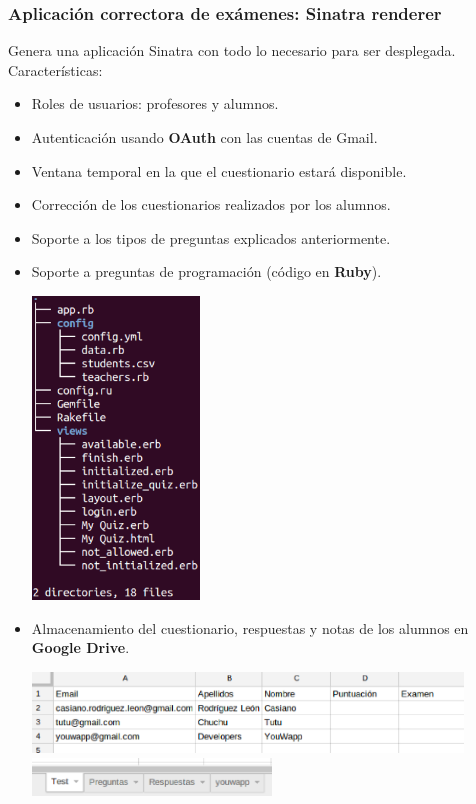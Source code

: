 \documentclass{beamer}
\begin{document}
\begin{frame}[allowframebreaks]
\frametitle{Aplicación correctora de exámenes: Sinatra renderer}
  Genera una aplicación Sinatra con todo lo necesario para ser desplegada.
  Características:
  \begin{itemize}
    \item Roles de usuarios: profesores y alumnos.
    \item Autenticación usando {\bfseries OAuth} con las cuentas de Gmail.
    \item Ventana temporal en la que el cuestionario estará disponible.
    \item Corrección de los cuestionarios realizados por los alumnos.
    \item Soporte a los tipos de preguntas explicados anteriormente.
    \item Soporte a preguntas de programación (código en {\bfseries Ruby}).
    \framebreak
    
    \begin{center}
      \includegraphics[width=0.35\textwidth]{img/tree.eps}
    \end{center}
    \framebreak
    
    \item Almacenamiento del cuestionario, respuestas y notas de los alumnos en {\bfseries Google Drive}.
    \bigskip
    \begin{center}
      \includegraphics[width=0.9\textwidth]{img/app0.eps}
      \newline
      \newline
      \includegraphics[width=0.5\textwidth]{img/app2.eps}
    \end{center}
    

\end{itemize}
\end{frame}
\end{document}
